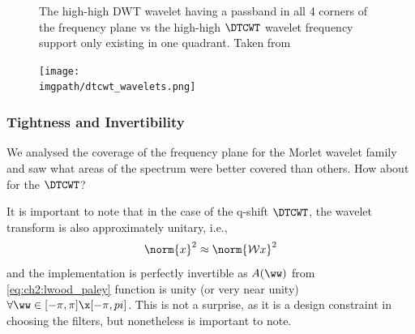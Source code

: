   \begin{figure}
      \newline
              { The high-high DWT wavelet having a passband in
              all 4 corners of the frequency plane vs  the
              high-high $\DTCWT$ wavelet frequency support only existing in one
              quadrant. Taken from \cite{selesnick_dual-tree_2005}}
      \label{fig:ch2:dwt_dtcwt_hh}
  \end{figure}
  \begin{figure}
    \centering
      \texttt{[image: \\imgpath/dtcwt\_wavelets.png]}
      \label{fig:ch2:dtcwt_wavelets}
  \end{figure}

\subsubsection{Tightness and Invertibility}
  We analysed the coverage of the frequency plane for the Morlet wavelet family
  and saw what areas of the spectrum were better covered than others. How about
  for the $\DTCWT$?

  It is important to note that in the case of the q-shift $\DTCWT$, the wavelet
  transform is also approximately unitary, i.e.,\
  \begin{equation}
    \norm{x}^2 \approx \norm{\mathcal{W}x}^2
  \end{equation}
  and the implementation is perfectly invertible as $A(\ww)$ from
  \eqref{eq:ch2:lwood_paley}
  function is unity (or very near unity) $\forall \ww \in [-\pi, \pi]\x [-\pi,
  pi]$. This is not a surprise, as it is a design
  constraint in choosing the filters, but nonetheless is important to note.

